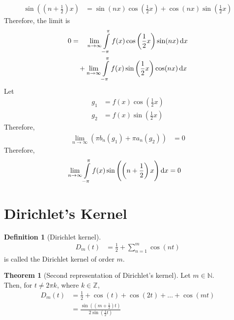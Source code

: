 \documentclass[fleqn, a4paper, 12pt, twoside]{article}
\theoremstyle{definition}
\newtheorem{definition}{Definition}
\theoremstyle{theorem}
\newtheorem{theorem}{Theorem}
\begin{document}
\begin{solution}
	\begin{align*}
		\sin\left( \left( n + \frac{1}{2} \right) x \right) &= \sin(n x) \cos\left( \frac{1}{2} x \right) + \cos(n x) \sin\left( \frac{1}{2} x \right)
	\end{align*}
	Therefore, the limit is
	\begin{align*}
		0 &= \quad \lim\limits_{n \to \infty} \int\limits_{-\pi}^{\pi} f(x) \cos\left( \frac{1}{2} x \right) \sin(n x) \dif x\\
		&\quad + \lim\limits_{n \to \infty} \int\limits_{-\pi}^{\pi} f(x) \sin\left( \frac{1}{2} x \right) \cos(n x) \dif x
	\end{align*}
	Let
	\begin{align*}
		g_1 &= f(x) \cos\left( \frac{1}{2} x \right)\\
		g_2 &= f(x) \sin\left( \frac{1}{2} x \right)
	\end{align*}
	Therefore,
	\begin{align*}
		\lim\limits_{n \to \infty} \left( \pi b_n(g_1) + \pi a_n(g_2) \right) &= 0
	\end{align*}
	Therefore,
	\begin{align*}
		\lim\limits_{n \to \infty} \int\limits_{-\pi}^{\pi} f(x) \sin\left( \left( n + \frac{1}{2} \right) x \right) \dif x &= 0
	\end{align*}
\end{solution}

\section{Dirichlet's Kernel}

\begin{definition}[Dirichlet kernel]
	\begin{align*}
		D_m(t) &= \frac{1}{2} + \sum\limits_{n = 1}^{m} \cos(n t)
	\end{align*}
	is called the Dirichlet kernel of order $m$.
\end{definition}

\begin{theorem}[Second representation of Dirichlet's kernel]
	Let $m \in \mathbb{N}$.\\
	Then, for $t \neq 2 \pi k$, where $k \in \mathbb{Z}$,
	\begin{align*}
		D_m(t) &= \frac{1}{2} + \cos(t) + \cos(2 t) + \dots + \cos(m t)\\
		&= \frac{\sin\left( \left( m + \frac{1}{2} \right) t \right)}{2 \sin\left( \frac{1}{2} t \right)}
	\end{align*}
\end{theorem}
\end{document}
